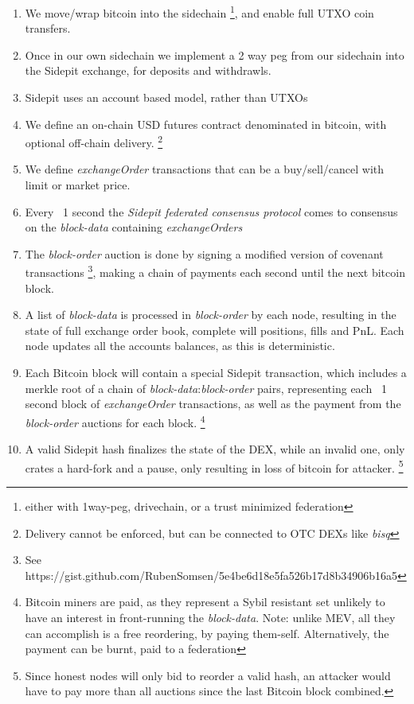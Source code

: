 \documentclass[12pt]{article}
\begin{document}
\begin{enumerate}[leftmargin=*]
\item We move/wrap bitcoin into the sidechain \footnote{either with 1way-peg, drivechain, or a trust minimized federation}, and enable full UTXO coin transfers. 
\item Once in our own sidechain we implement a 2 way peg from our sidechain into the Sidepit exchange, for deposits and withdrawls. 
\item Sidepit uses an account based model, rather than UTXOs 
\item We define an on-chain USD futures contract denominated in bitcoin, with optional off-chain delivery. \footnote{Delivery cannot be enforced, but can  be connected to OTC DEXs like \emph{bisq}}  
\item We define \emph{exchangeOrder} transactions that can be a buy/sell/cancel with limit or market price.
\item Every ~1 second the \emph{Sidepit federated consensus protocol} comes to consensus on the \emph{block-data} containing \emph{exchangeOrders}
\item The \emph{block-order} auction is done by signing a modified version of covenant transactions \footnote{See https://gist.github.com/RubenSomsen/5e4be6d18e5fa526b17d8b34906b16a5}, making a chain of payments each second until the next bitcoin block.     
\item A list of \emph{block-data} is processed in \emph{block-order} by each node, resulting in the state of full exchange order book, complete will positions, fills and PnL. Each node updates all the accounts balances, as this is deterministic.  
\item Each Bitcoin block will contain a special Sidepit transaction, which includes a merkle root of a chain of \emph{block-data}:\emph{block-order} pairs, representing each ~1 second block of \emph{exchangeOrder} transactions, as well as the payment from the \emph{block-order} auctions for each block. \footnote{Bitcoin miners are paid, as they represent a Sybil resistant set unlikely to have an interest in front-running the \emph{block-data}. Note: unlike MEV, all they can accomplish is a free reordering, by paying them-self. Alternatively, the payment can be burnt, paid to a federation} 
\item A valid Sidepit hash finalizes the state of the DEX, while an invalid one, only crates a hard-fork and a pause, only resulting in loss of bitcoin for attacker. \footnote{Since honest nodes will only bid to reorder a valid hash, an attacker would have to pay more than all auctions since the last Bitcoin block combined.}
\end{enumerate}
\end{document}

